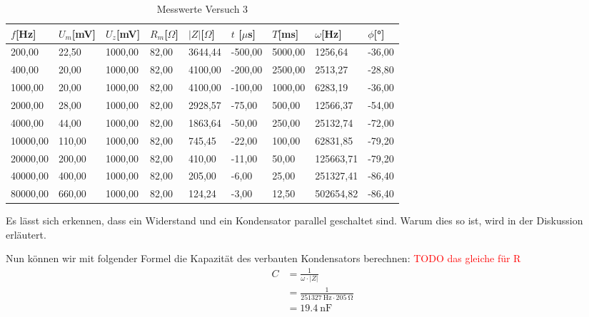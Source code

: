         \begin{table}[H]
            \centering
            \caption{Messwerte Versuch 3}
            \vspace{0.5em}
            \begin{tabular}{|l||l|l|l|l|l|l|l|l|}
                \hline
                $f$[Hz] & $U_m$[mV]  & $U_z$[mV] & $R_{m}$[$\Omega$] & $|Z|$[$\Omega$] & $t$ [$\mu$s] & $T$[ms] & $\omega$[Hz] & $\phi$[°] \\
                \hline
                \hline
                200,00   & 22,50  & 1000,00 & 82,00 & 3644,44 & -500,00 & 5000,00 & 1256,64   & -36,00 \\
                \hline
                400,00   & 20,00  & 1000,00 & 82,00 & 4100,00 & -200,00 & 2500,00 & 2513,27   & -28,80 \\
                \hline
                1000,00  & 20,00  & 1000,00 & 82,00 & 4100,00 & -100,00 & 1000,00 & 6283,19   & -36,00 \\
                \hline
                2000,00  & 28,00  & 1000,00 & 82,00 & 2928,57 & -75,00  & 500,00  & 12566,37  & -54,00 \\
                \hline
                4000,00  & 44,00  & 1000,00 & 82,00 & 1863,64 & -50,00  & 250,00  & 25132,74  & -72,00 \\
                \hline
                10000,00 & 110,00 & 1000,00 & 82,00 & 745,45  & -22,00  & 100,00  & 62831,85  & -79,20 \\
                \hline
                20000,00 & 200,00 & 1000,00 & 82,00 & 410,00  & -11,00  & 50,00   & 125663,71 & -79,20 \\
                \hline
                40000,00 & 400,00 & 1000,00 & 82,00 & 205,00  & -6,00   & 25,00   & 251327,41 & -86,40 \\
                \hline
                80000,00 & 660,00 & 1000,00 & 82,00 & 124,24  & -3,00   & 12,50   & 502654,82 & -86,40\\
                \hline
            \end{tabular}
            \label{tab:Versuch3_Messwerte}
        \end{table}

        \noindent Es lässt sich erkennen, dass ein Widerstand und ein Kondensator parallel geschaltet sind. Warum dies so ist, wird in der Diskussion erläutert.

        \noindent Nun können wir mit folgender Formel die Kapazität des verbauten Kondensators berechnen:
        \textcolor{red}{TODO das gleiche für R}
        \begin{equation}
            \begin{aligned}
                C &= \frac{1}{\omega \cdot |Z|}\\
                  &= \frac{1}{251327\ \mathrm{Hz} \cdot 205\ \mathrm{\Omega}}\\
                  &= 19.4\ \mathrm{nF}
                \label{eq:Versuch3_Kapazität}
            \end{aligned}
        \end{equation}

